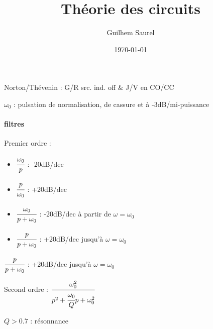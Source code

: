 \documentclass[10pt,twocolumn,a4paper]{article}
\title{Théorie des circuits}
\date{\today}
\author{Guilhem Saurel}
\begin{document}
Norton/Thévenin : G/R src. ind. off \& J/V en CO/CC

%
%
%
%
%

$\omega_0$ : pulsation de normalisation, de cassure et à -3dB/mi-puissance

\paragraph{filtres}
Premier ordre : 
\begin{itemize}
 \item $\cfrac{\omega_0}{p}$ : -20dB/dec
 \item $\cfrac{p}{\omega_0}$ : +20dB/dec
 \item $\cfrac{\omega_0}{p+\omega_0}$ : -20dB/dec à partir de $\omega = \omega_0$
 \item $\cfrac{p}{p+\omega_0}$ : +20dB/dec jusqu'à $\omega = \omega_0$
\end{itemize}

$\cfrac{p}{p+\omega_0}$ : +20dB/dec jusqu'à $\omega = \omega_0$

Second ordre : $\cfrac{\omega_0^2}{p^2 + \cfrac{\omega_0}{Q} p + \omega_0^2}$

$Q>0.7$ : résonnance
\end{document}
